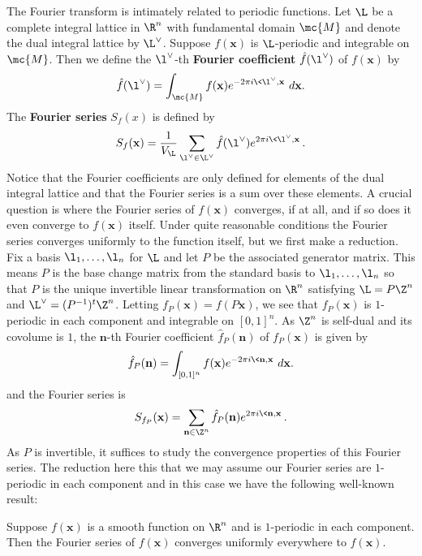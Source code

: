   The Fourier transform is intimately related to periodic functions. Let \(\L\) be a complete integral lattice in \(\R^{n}\) with fundamental domain \(\mc{M}\) and denote the dual integral lattice by \(\L^{\vee}\). Suppose \(f(\mathbf{x})\) is \(\L\)-periodic and integrable on \(\mc{M}\). Then we define the \(\l^{\vee}\)-th \textbf{Fourier coefficient} \(\hat{f}(\l^{\vee})\) of \(f(\mathbf{x})\) by
  \[
    \hat{f}(\l^{\vee}) = \int_{\mc{M}}f(\mathbf{x})e^{-2\pi i\<\l^{\vee},\mathbf{x}\>}\,d\mathbf{x}.
  \]
  The \textbf{Fourier series} \(S_{f}(x)\) is defined by
  \[
    S_{f}(\mathbf{x}) = \frac{1}{V_{\L}}\sum_{\l^{\vee} \in \L^{\vee}}\hat{f}(\l^{\vee})e^{2\pi i\<\l^{\vee},\mathbf{x}\>}.
  \]
  Notice that the Fourier coefficients are only defined for elements of the dual integral lattice and that the Fourier series is a sum over these elements. A crucial question is where the Fourier series of \(f(\mathbf{x})\) converges, if at all, and if so does it even converge to \(f(\mathbf{x})\) itself. Under quite reasonable conditions the Fourier series converges uniformly to the function itself, but we first make a reduction. Fix a basis \(\l_{1},\ldots,\l_{n}\) for \(\L\) and let \(P\) be the associated generator matrix. This means \(P\) is the base change matrix from the standard basis to \(\l_{1},\ldots,\l_{n}\) so that \(P\) is the unique invertible linear transformation on \(\R^{n}\) satisfying \(\L = P\Z^{n}\) and \(\L^{\vee} = (P^{-1})^{t}\Z^{n}\). Letting \( f_{P}(\mathbf{x}) = f(P\mathbf{x})\), we see that \(f_{P}(\mathbf{x})\) is \(1\)-periodic in each component and integrable on \([0,1]^{n}\). As \(\Z^{n}\) is self-dual and its covolume is \(1\), the \(\mathbf{n}\)-th Fourier coefficient \(\hat{f}_{P}(\mathbf{n})\) of \(f_{P}(\mathbf{x})\) is given by
  \[
    \hat{f}_{P}(\mathbf{n}) = \int_{[0,1]^{n}}f(\mathbf{x})e^{-2\pi i\<\mathbf{n},\mathbf{x}\>}\,d\mathbf{x}.
  \]
  and the Fourier series is
  \[
    S_{f_{P}}(\mathbf{x}) = \sum_{\mathbf{n} \in \Z^{n}}\hat{f}_{P}(\mathbf{n})e^{2\pi i\<\mathbf{n},\mathbf{x}\>}.
  \]
  As \(P\) is invertible, it suffices to study the convergence properties of this Fourier series. The reduction here this that we may assume our Fourier series are \(1\)-periodic in each component and in this case we have the following well-known result:

  \begin{theorem}
    Suppose \(f(\mathbf{x})\) is a smooth function on \(\R^{n}\) and is \(1\)-periodic in each component. Then the Fourier series of \(f(\mathbf{x})\) converges uniformly everywhere to \(f(\mathbf{x})\).
  \end{theorem}


